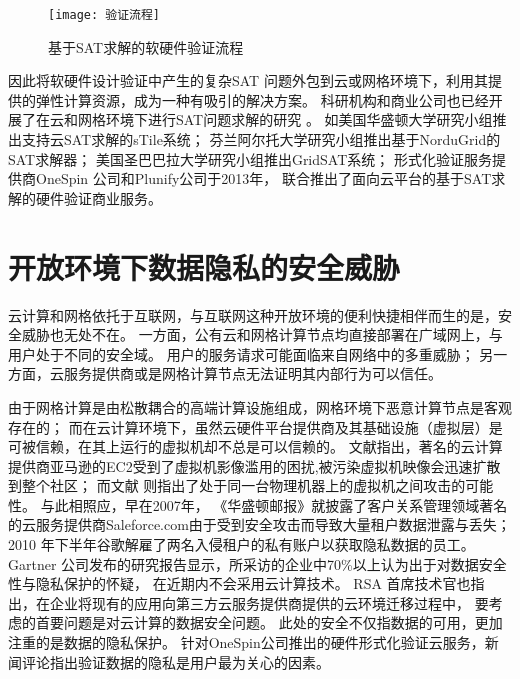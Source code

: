 \begin{figure}[t] %
  \centering
  \texttt{[image: 验证流程]}
  \caption{基于SAT求解的软硬件验证流程}
  \label{verfication-procedure}
\end{figure}

因此将软硬件设计验证中产生的复杂SAT 问题外包到云或网格环境下，利用其提供的弹性计算资源，成为一种有吸引的解决方案。
科研机构和商业公司也已经开展了在云和网格环境下进行SAT问题求解的研究
。
如美国华盛顿大学研究小组推出支持云SAT求解的sTile系统；
芬兰阿尔托大学研究小组推出基于NorduGrid的SAT求解器；
美国圣巴巴拉大学研究小组推出GridSAT系统；
形式化验证服务提供商OneSpin 公司和Plunify公司于2013年，
联合推出了面向云平台的基于SAT求解的硬件验证商业服务。

\section{开放环境下数据隐私的安全威胁}
云计算和网格依托于互联网，与互联网这种开放环境的便利快捷相伴而生的是，安全威胁也无处不在。
一方面，公有云和网格计算节点均直接部署在广域网上，与用户处于不同的安全域。
用户的服务请求可能面临来自网络中的多重威胁；
另一方面，云服务提供商或是网格计算节点无法证明其内部行为可以信任。

由于网格计算是由松散耦合的高端计算设施组成，网格环境下恶意计算节点是客观存在的；
而在云计算环境下，虽然云硬件平台提供商及其基础设施（虚拟层）是可被信赖，在其上运行的虚拟机却不总是可以信赖的。
文献指出，著名的云计算提供商亚马逊的EC2受到了虚拟机影像滥用的困扰,被污染虚拟机映像会迅速扩散到整个社区；
而文献 则指出了处于同一台物理机器上的虚拟机之间攻击的可能性。
与此相照应，早在2007年，
《华盛顿邮报》就披露了客户关系管理领域著名的云服务提供商Saleforce.com由于受到安全攻击而导致大量租户数据泄露与丢失；
2010 年下半年谷歌解雇了两名入侵租户的私有账户以获取隐私数据的员工。
Gartner 公司发布的研究报告显示，所采访的企业中70\%以上认为出于对数据安全性与隐私保护的怀疑，
在近期内不会采用云计算技术。
RSA 首席技术官也指出，在企业将现有的应用向第三方云服务提供商提供的云环境迁移过程中，
要考虑的首要问题是对云计算的数据安全问题。
此处的安全不仅指数据的可用，更加注重的是数据的隐私保护。
针对OneSpin公司推出的硬件形式化验证云服务，新闻评论指出验证数据的隐私是用户最为关心的因素。

